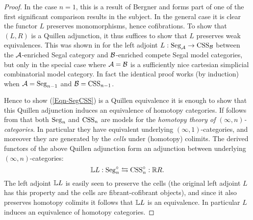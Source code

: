 \documentclass{amsart}
\begin{document}
\begin{proof}
	In the case $n=1$, this is a result of Bergner \cite[Thm 6.3]{MR2321038} and forms part of one of the first significant comparison results in the subject. In the general case it is clear the functor $L$ preserves monomorphisms, hence cofibrations. To show that $(L,R)$ is a Quillen adjunction, it thus suffices to show that $L$ preserves weak equivalences. This was shown in \cite[Lem. 2.3.13]{0905.0462} for the left adjoint $L: \mathrm{Seg}_{\mathcal A} \to \mathrm{CSS}_{\mathcal B}$ between the $\mathcal A$-enriched Segal category and $\mathcal B$-enriched compete Segal model categories, but only in the special case where $\mathcal A = \mathcal B$ is a sufficiently nice cartesian simplicial combinatorial model category. In fact the identical proof works (by induction) when $\mathcal A = \mathrm{Seg}_{n-1}$ and $\mathcal B= \mathrm{CSS}_{n-1}$.  
	
	Hence to show (\ref{Eqn-SegCSS}) is a Quillen equivalence it is enough to show that this Quillen adjunction induces an equivalence of homotopy categories. 
	If follows from \cite[Thm. 12.6, Ex. 13.8]{1112.0040} that both $\mathrm{Seg}_n$ and $\mathrm{CSS}_n$ are models for the {\em homotopy theory of $(\infty,n)$-categories}. In particular they have equivalent underlying  $(\infty,1)$-categories, and moreover they are generated by the {\em cells} under (homotopy) colimits. The derived functors of the above Quillen adjunction form an adjunction between underlying $(\infty,n)$-categories:
	\begin{equation*}
		\mathbb L L : \mathrm{Seg}_n^{\circ} \leftrightarrows \mathrm{CSS}_n^{\circ}: \mathbb R R.
	\end{equation*} 
The left adjoint $\mathbb L L$ is easily seen to preserve the {cells} (the original left adjoint $L$ has this property and the cells are fibrant-cofibrant objects), and since it also preserves homotopy colimits it follows that $\mathbb L L$ is an equivalence. In particular $L$ induces an equivalence of homotopy categories. 	
\end{proof}
\end{document}
